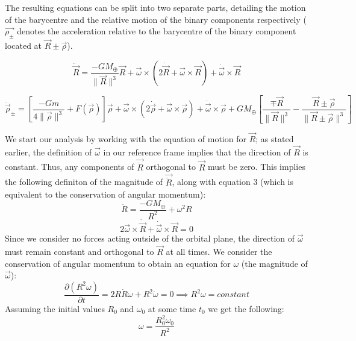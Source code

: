 \documentclass[letterpaper, preprint, paper,11pt]{AAS}	%
\begin{document}
The resulting equations can be split into two separate parts, detailing the motion of the barycentre and the relative motion of the binary components respectively ($\vec{\rho_{\pm}}$ denotes the acceleration relative to the barycentre of the binary component located at $\vec{R}\pm\vec{\rho}$).
 
\begin{equation}
\ddot{\vec{R}} = \frac{-GM_\oplus}{\|\vec{R}\|^{3}}\vec{R}+\vec{\omega}\times(2\dot{\vec{R}}+\vec{\omega}\times\vec{R})+\dot{\vec{\omega}}\times\vec{R}
\end{equation}

\begin{equation}
\ddot{\vec{\rho}}_{\pm} = \left[\frac{-Gm}{4\|\vec{\rho}\|^{3}}+F(\vec{\rho})\right]\vec{\rho}+\vec{\omega}\times(2\dot{\vec{\rho}}+\vec{\omega}\times\vec{\rho})+\dot{\vec{\omega}}\times\vec{\rho}+{GM_\oplus}\left[\frac{\mp\vec{R}}{\|\vec{R}\|^{3}}-\frac{\vec{R}\pm\vec{\rho}}{\|\vec{R}\pm\vec{\rho}\|^{3}}\right]
\end{equation}



We start our analysis by working with the equation of motion for $\vec{R}$; as stated earlier, the definition of $\vec{\omega}$ in our reference frame implies that the direction of $\vec{R}$ is constant. Thus, any components of $\vec{\ddot{R}}$ orthogonal to $\vec{R}$ must be zero. This implies the following definiton of the magnitude of $\vec{\ddot{R}}$, along with equation 3 (which is equivalent to the conservation of angular momentum): 
\begin{equation}
\ddot{R} = \frac{-GM_\oplus}{R^{2}}+\omega^{2}R
\end{equation}
\begin{equation}
2\vec{\omega}\times\dot{\vec{R}}+\dot{\vec{\omega}}\times\vec{R}=0
\end{equation}
Since we consider no forces acting outside of the orbital plane, the direction of $\vec{\omega}$ must remain constant and orthogonal to $\vec{R}$ at all times. We consider the conservation of angular momentum to obtain an equation for $\omega$ (the magnitude of $\vec{\omega}$):
\begin{equation}
\frac{\partial\left(R^{2}\omega\right)}{\partial t} = 2R\dot{R}\omega + R^{2}\dot{\omega} = 0 \implies R^{2}\omega = constant
\end{equation}
Assuming the initial values $R_0$ and $\omega_0$ at some time $t_0$ we get the following:
\begin{equation}
\omega = \frac{R_0^{2}\omega_0}{R^{2}}
\end{equation}
\end{document}
